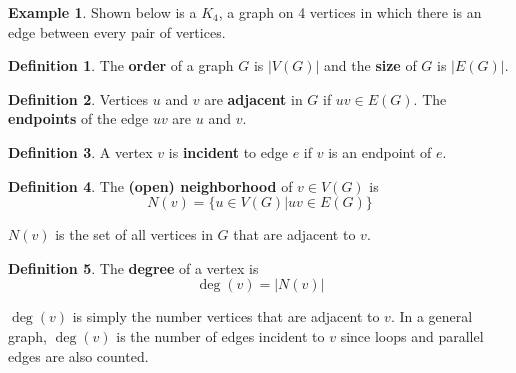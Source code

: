 \documentclass[12pt]{article}
\theoremstyle{definition}
\newtheorem{defn}{Definition}[section]
\newtheorem{ex}{Example}[section]
\begin{document}
\begin{graybox}
    \begin{ex}
    Shown below is a $K_4$, a graph on 4 vertices in which there is an edge between every pair of vertices.
    \center
    \end{ex}
\end{graybox}

\begin{bluebox}
    \begin{defn}
    The \textbf{order} of a graph $G$ is $|V(G)|$ and the \textbf{size} of $G$ is $|E(G)|$.
\end{defn}
\end{bluebox}

\begin{bluebox}
    \begin{defn}
    Vertices $u$ and $v$ are \textbf{adjacent} in $G$ if $uv \in E(G)$. The \textbf{endpoints} of the edge $uv$ are $u$ and $v$.
\end{defn}
\end{bluebox}

\begin{bluebox}
    \begin{defn}
    A vertex $v$ is \textbf{incident} to edge $e$ if $v$ is an endpoint of $e$.
\end{defn}
\end{bluebox}

\begin{bluebox}
    \begin{defn}
    The \textbf{(open) neighborhood} of $v\in V(G)$ is
    \[N(v) = \{ u \in V(G) | uv \in E(G) \}\]
\end{defn}
\end{bluebox}
$N(v)$ is the set of all vertices in $G$ that are adjacent to $v$.

\begin{bluebox}
    \begin{defn}
        The \textbf{degree} of a vertex is
        \[\deg(v) = |N(v)|\]
    \end{defn}
\end{bluebox}
$\deg(v)$ is simply the number vertices that are adjacent to $v$. In a general graph, $\deg(v)$ is the number of edges incident to $v$ since loops and parallel edges are also counted.
\end{document}
